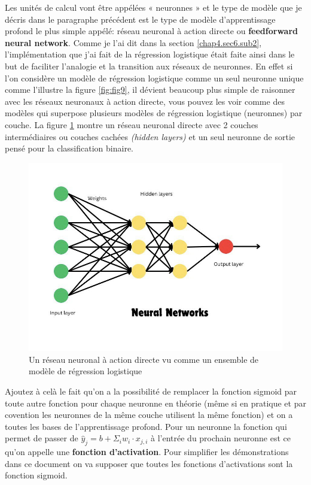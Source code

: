 Les unités de calcul vont être appélées « neuronnes » et le type de modèle que je décris dans le paragraphe précédent est le type de modèle d'apprentissage profond le plus simple appélé: réseau neuronal à action directe ou \textbf{feedforward neural network}. Comme je l'ai dit dans la section \ref{chap4.sec6.sub2}, l'implémentation que j'ai fait de la régression logistique était faite ainsi dans le but de faciliter l'analogie et la transition aux réseaux de neuronnes. En effet si l'on considère un modèle de régression logistique comme un seul neuronne unique comme l'illustre la figure \ref{fig:fig9}, il dévient beaucoup plus simple de raisonner avec les réseaux neuronaux à action directe,  vous pouvez les voir comme des modèles qui superpose plusieurs modèles de régression logistique (neuronnes) par couche. La figure \ref{fig:fig10} montre un réseau neuronal directe avec 2 couches intermédiaires ou couches cachées \textit{(hidden layers)} et un seul neuronne de sortie pensé pour la classification binaire.

\begin{figure}
    \centering
    \includegraphics[width=0.75\linewidth]{images/neuralnet.png}
    \caption{Un réseau neuronal à action directe vu comme un ensemble de modèle de régression logistique}
    \label{fig:fig10}
\end{figure}

Ajoutez à celà le fait qu'on a la possibilité de remplacer la fonction sigmoid par toute autre fonction pour chaque neuronne en théorie (même si en pratique et par covention les neuronnes de la même couche utilisent la même fonction) et on a toutes les bases de l'apprentissage profond. Pour un neuronne la fonction qui permet de passer de \(\hat{y}_j = b + \Sigma_i w_i \cdot x_{j,i}\) à l'entrée du prochain neuronne est ce qu'on appelle une \textbf{fonction d'activation}. Pour simplifier les démonstrations dans ce document on va supposer que toutes les fonctions d'activations sont la fonction sigmoid.

